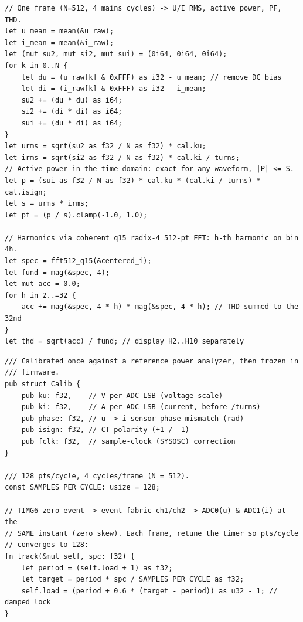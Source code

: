 \documentclass[12pt]{article}
\begin{document}
\begin{lstlisting}[style=rust,caption={测量核心摘录：时域 RMS/有功功率/功率因数与相干 FFT 的 THD}]
// One frame (N=512, 4 mains cycles) -> U/I RMS, active power, PF, THD.
let u_mean = mean(&u_raw);
let i_mean = mean(&i_raw);
let (mut su2, mut si2, mut sui) = (0i64, 0i64, 0i64);
for k in 0..N {
    let du = (u_raw[k] & 0xFFF) as i32 - u_mean; // remove DC bias
    let di = (i_raw[k] & 0xFFF) as i32 - i_mean;
    su2 += (du * du) as i64;
    si2 += (di * di) as i64;
    sui += (du * di) as i64;
}
let urms = sqrt(su2 as f32 / N as f32) * cal.ku;
let irms = sqrt(si2 as f32 / N as f32) * cal.ki / turns;
// Active power in the time domain: exact for any waveform, |P| <= S.
let p = (sui as f32 / N as f32) * cal.ku * (cal.ki / turns) * cal.isign;
let s = urms * irms;
let pf = (p / s).clamp(-1.0, 1.0);

// Harmonics via coherent q15 radix-4 512-pt FFT: h-th harmonic on bin 4h.
let spec = fft512_q15(&centered_i);
let fund = mag(&spec, 4);
let mut acc = 0.0;
for h in 2..=32 {
    acc += mag(&spec, 4 * h) * mag(&spec, 4 * h); // THD summed to the 32nd
}
let thd = sqrt(acc) / fund; // display H2..H10 separately
\end{lstlisting}

\begin{lstlisting}[style=rust,caption={标定系数与相干采样/锁频摘录}]
/// Calibrated once against a reference power analyzer, then frozen in
/// firmware.
pub struct Calib {
    pub ku: f32,    // V per ADC LSB (voltage scale)
    pub ki: f32,    // A per ADC LSB (current, before /turns)
    pub phase: f32, // u -> i sensor phase mismatch (rad)
    pub isign: f32, // CT polarity (+1 / -1)
    pub fclk: f32,  // sample-clock (SYSOSC) correction
}

/// 128 pts/cycle, 4 cycles/frame (N = 512).
const SAMPLES_PER_CYCLE: usize = 128;

// TIMG6 zero-event -> event fabric ch1/ch2 -> ADC0(u) & ADC1(i) at the
// SAME instant (zero skew). Each frame, retune the timer so pts/cycle
// converges to 128:
fn track(&mut self, spc: f32) {
    let period = (self.load + 1) as f32;
    let target = period * spc / SAMPLES_PER_CYCLE as f32;
    self.load = (period + 0.6 * (target - period)) as u32 - 1; // damped lock
}
\end{lstlisting}
\end{document}
